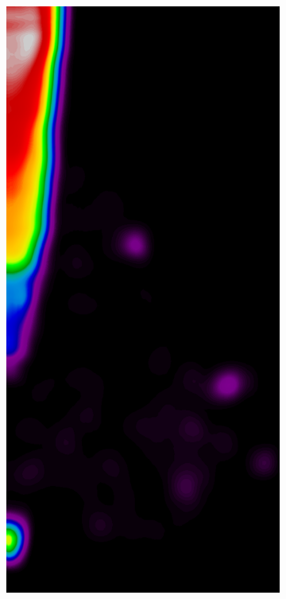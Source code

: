 \documentclass{beamer}
\begin{document}
\begin{frame}
\begin{figure}
\begin{subfigure}{0.134\textwidth}
            \end{subfigure}
            \begin{subfigure}{0.134\textwidth}
	            \centering
		            \includegraphics[width=\textwidth]{plots/examples/example1_probs_1_3.png}

\end{subfigure}
\end{figure}
\end{frame}
\end{document}
